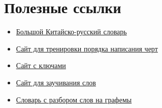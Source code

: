 \section{Полезные ссылки}
\begin{itemize}
	\item \href{https://bkrs.info/}{Большой Китайско-русский словарь}
	\item \href{https://hanziworkbook.tilda.ws/hanzi}{Сайт для тренировки порядка написания черт}
	\item \href{https://studychinese.ru/kljuchi/}{Сайт с ключами}
	\item \href{http://quizlet.com/960846817}{Сайт для заучивания слов}
	\item \href{https://www.trainchinese.com/v2/index.php?rAp=0&tcLanguage=ru}{Словарь с разбором слов на графемы}
\end{itemize}